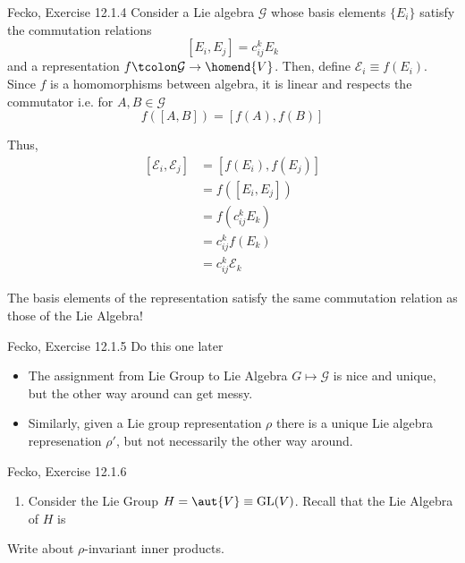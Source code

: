 \documentclass[11pt]{article}
\begin{document}
\begin{ex}{Fecko, Exercise 12.1.4}
    Consider a Lie algebra $\mathcal{G}$ whose basis elements $\{E_i\}$ satisfy the commutation relations 
    \[ [E_i, E_j] = c^k_{ij} E_k  \]
    and a representation $f \tcolon \mathcal{G} \rightarrow \homend{V}$. Then, define $\mathcal{E}_i \equiv f(E_i)$. Since $f$ is a homomorphisms between algebra, it is linear and respects the commutator i.e. for $A, B \in \mathcal{G}$
    \[ f\left( [A, B] \right) = \left[f(A), f(B)\right] \] 

    Thus, 
    \begin{align*}
      \left[ \mathcal{E}_i, \mathcal{E}_j \right] &= \left[f(E_i), f(E_j) \right] \\
      &= f\left([E_i, E_j]\right) \\
      &= f\left(c^k_{ij} E_k\right) \\
      &= c^{k}_{ij} f(E_k) \\
      &= c^{k}_{ij} \mathcal{E}_k 
    \end{align*}

    \begin{thought}{The basis elements of the representation satisfy the same commutation relation as those of the Lie Algebra!}
    \end{thought}
\end{ex}

\begin{ex}{Fecko, Exercise 12.1.5}
    Do this one later
\end{ex}

\vskip 0.5cm
\begin{itemize}
  \item The assignment from Lie Group to Lie Algebra $G \mapsto \mathcal{G}$ is nice and unique, but the other way around can get messy.
  \item Similarly, given a Lie group representation $\rho$ there is a unique Lie algebra represenation $\rho'$, but not necessarily the other way around. 
\end{itemize}


\begin{ex}{Fecko, Exercise 12.1.6}
  \begin{enumerate}[label=(\roman*)]
    \item Consider the Lie Group $H = \aut{V} \equiv \mathrm{GL}(V)$. 
    Recall that the Lie Algebra of $H$ is 
  \end{enumerate}
\end{ex}

\vskip 0.5cm
Write about $\rho$-invariant inner products.

    



\end{document}
